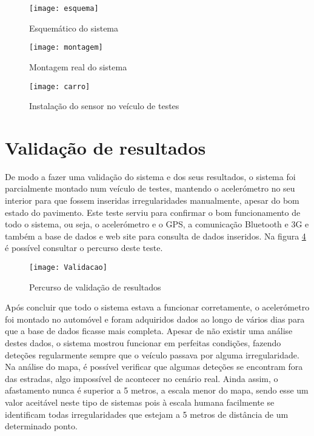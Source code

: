 \begin{figure}[htbp]
	\centering
	\texttt{[image: esquema]}
	\caption{Esquemático do sistema}
	\label{fig:esquematico_do_sistema}
\end{figure}

\begin{figure}[htbp]
	\centering
	\texttt{[image: montagem]}
	\caption{Montagem real do sistema}
	\label{fig:montagem_real_do_sistema}
\end{figure}

\begin{figure}[htbp]
	\centering
	\texttt{[image: carro]}
	\caption{Instalação do sensor no veículo de testes}
	\label{fig:carro}
\end{figure}

\section{Validação de resultados}
\label{sec:validacao}

De modo a fazer uma validação do sistema e dos seus resultados, o sistema foi parcialmente montado num veículo de testes, mantendo o acelerómetro no seu interior para que fossem inseridas irregularidades manualmente, apesar do bom estado do pavimento.
Este teste serviu para confirmar o bom funcionamento de todo o sistema, ou seja, o acelerómetro e o GPS, a comunicação Bluetooth e 3G e também a base de dados e web site para consulta de dados inseridos.
Na figura \ref{fig:validacao} é possível consultar o percurso deste teste.

\begin{figure}[htbp]
	\centering
	\texttt{[image: Validacao]}
	\caption{Percurso de validação de resultados}
	\label{fig:validacao}
\end{figure}

Após concluir que todo o sistema estava a funcionar corretamente, o acelerómetro foi montado no automóvel e foram adquiridos dados ao longo de vários dias para que a base de dados ficasse mais completa.
Apesar de não existir uma análise destes dados, o sistema mostrou funcionar em perfeitas condições, fazendo deteções regularmente sempre que o veículo passava por alguma irregularidade.
Na análise do mapa, é possível verificar que algumas deteções se encontram fora das estradas, algo impossível de acontecer no cenário real.
Ainda assim, o afastamento nunca é superior a 5 metros, a escala menor do mapa, sendo esse um valor aceitável neste tipo de sistemas pois à escala humana facilmente se identificam todas irregularidades que estejam a 5 metros de distância de um determinado ponto.

